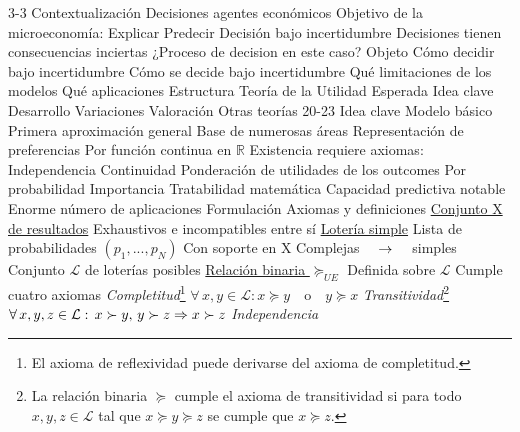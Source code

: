 \documentclass{nuevotema}
\begin{document}
\begin{esquemal}
	\1[]  3-3
		\2 Contextualización
			\3 Decisiones agentes económicos
				\4 Objetivo de la microeconomía:
				\4 Explicar
				\4 Predecir
			\3 Decisión bajo incertidumbre
				\4 Decisiones tienen consecuencias inciertas
				\4 ¿Proceso de decision en este caso?
		\2 Objeto
			\3 Cómo decidir bajo incertidumbre
			\3 Cómo se decide bajo incertidumbre
			\3 Qué limitaciones de los modelos
			\3 Qué aplicaciones
		\2 Estructura
			\3 Teoría de la Utilidad Esperada
				\4 Idea clave
				\4 Desarrollo
				\4 Variaciones
				\4 Valoración
			\3 Otras teorías
	\1  20-23
		\2 Idea clave
			\3 Modelo básico
				\4 Primera aproximación general
				\4 Base de numerosas áreas
			\3 Representación de preferencias
				\4 Por función continua en $\mathbb{R}$
				\4 Existencia requiere axiomas:
				\4[] Independencia
				\4[] Continuidad
				\4 Ponderación de utilidades de los outcomes
				\4[] Por probabilidad
			\3 Importancia
				\4 Tratabilidad matemática
				\4 Capacidad predictiva notable
				\4 Enorme número de aplicaciones
		\2 Formulación
			\3 Axiomas y definiciones
				\4 \underline{Conjunto X de resultados}
				\4[] Exhaustivos e incompatibles entre sí
				\4 \underline{Lotería simple}
				\4[] Lista de probabilidades $(p_1, ..., p_N)$
				\4[] Con soporte en X
				\4[] Complejas $\quad \rightarrow \quad$ simples
				\4[] Conjunto $\mathcal{L}$ de loterías posibles
				\4 \underline{Relación binaria $\succeq_{UE}$}
				\4[] Definida sobre $\mathcal{L}$
				\4[] Cumple cuatro axiomas
				\4[Axioma I] \textit{Completitud}\footnote{El axioma de reflexividad puede derivarse del axioma de completitud.}
				\4[] $\forall \, x, y \in \mathcal{L}: x \succeq y \quad \text{o} \quad y \succeq x$
				\4[Axioma II] \textit{Transitividad}\footnote{La relación binaria $\succeq$ cumple el axioma de transitividad si para todo $x, y, z \in \mathcal{L}$ tal que $x \succeq y \succeq z$ se cumple que $x \succeq z$.}
				\4[] $\forall \, x, y, z \in \mathcal{L}: \, x \succ y, \, y \succ z \Rightarrow x \succ z$
				 \textit{Independencia} %
                    

\end{esquemal}
\end{document}

